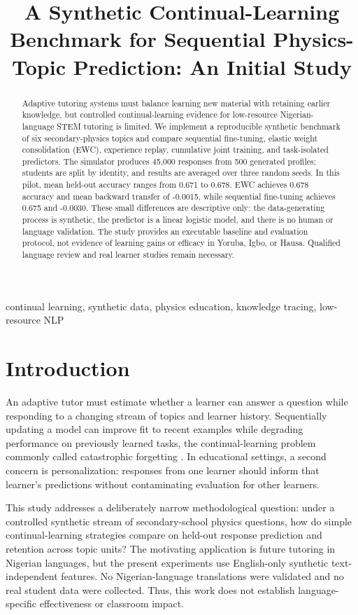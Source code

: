 \documentclass[conference]{IEEEtran}
\title{A Synthetic Continual-Learning Benchmark for Sequential Physics-Topic Prediction: An Initial Study}
\author{\IEEEauthorblockN{Author Name(s)}\IEEEauthorblockA{Institution\\Email}}
\begin{document}
\maketitle
\begin{abstract}
Adaptive tutoring systems must balance learning new material with retaining earlier knowledge, but controlled continual-learning evidence for low-resource Nigerian-language STEM tutoring is limited. We implement a reproducible synthetic benchmark of six secondary-physics topics and compare sequential fine-tuning, elastic weight consolidation (EWC), experience replay, cumulative joint training, and task-isolated predictors. The simulator produces 45,000 responses from 500 generated profiles; students are split by identity, and results are averaged over three random seeds. In this pilot, mean held-out accuracy ranges from 0.671 to 0.678. EWC achieves 0.678 accuracy and mean backward transfer of -0.0015, while sequential fine-tuning achieves 0.675 and -0.0030. These small differences are descriptive only: the data-generating process is synthetic, the predictor is a linear logistic model, and there is no human or language validation. The study provides an executable baseline and evaluation protocol, not evidence of learning gains or efficacy in Yoruba, Igbo, or Hausa. Qualified language review and real learner studies remain necessary.
\end{abstract}
\begin{IEEEkeywords}continual learning, synthetic data, physics education, knowledge tracing, low-resource NLP\end{IEEEkeywords}
\section{Introduction}
An adaptive tutor must estimate whether a learner can answer a question while responding to a changing stream of topics and learner history. Sequentially updating a model can improve fit to recent examples while degrading performance on previously learned tasks, the continual-learning problem commonly called catastrophic forgetting \cite{mccloskey1989, kirkpatrick2017}. In educational settings, a second concern is personalization: responses from one learner should inform that learner's predictions without contaminating evaluation for other learners.

This study addresses a deliberately narrow methodological question: under a controlled synthetic stream of secondary-school physics questions, how do simple continual-learning strategies compare on held-out response prediction and retention across topic units? The motivating application is future tutoring in Nigerian languages, but the present experiments use English-only synthetic text-independent features. No Nigerian-language translations were validated and no real student data were collected. Thus, this work does not establish language-specific effectiveness or classroom impact.
\end{document}
